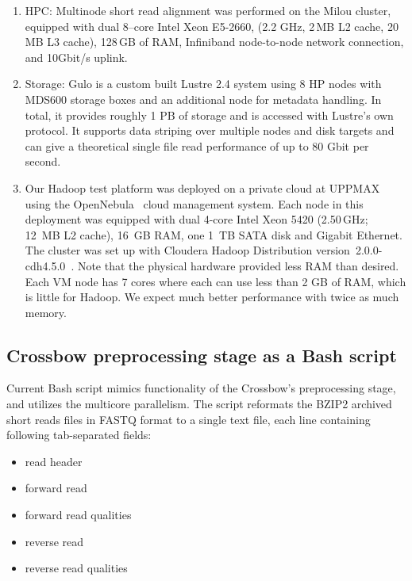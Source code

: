 \documentclass[10pt]{article}
\begin{document}
\begin{enumerate}

\item 
HPC:
Multinode short read alignment was performed on the Milou cluster\cite{milouCluster}, equipped with dual 8--core Intel Xeon E5-2660, (2.2 GHz, 2\,MB L2 cache, 20\,MB L3 cache), 128\,GB of RAM, Infiniband node-to-node network connection, and 10Gbit/s uplink.

\item Storage: 
Gulo\cite{gulo} is a custom built Lustre 2.4 system using 8 HP nodes with MDS600 storage boxes and an additional node for metadata handling. In total, it provides roughly 1 PB of storage and is accessed with Lustre's own protocol. It supports data striping over multiple nodes and disk targets and can give a theoretical single file read performance of up to 80 Gbit per second.

\item Our Hadoop test platform was deployed on a private cloud at UPPMAX using the OpenNebula~\cite{opennebula} cloud management system. Each node in this deployment was equipped with dual 4-core Intel Xeon 5420 (2.50\,GHz; 12~MB L2 cache), 16~GB RAM, one 1~TB SATA disk and Gigabit Ethernet. The cluster was set up with Cloudera Hadoop Distribution version~2.0.0-cdh4.5.0~\cite{cloudera}.
Note that the physical hardware provided less RAM than desired. Each VM node has 7 cores where each can use less than 2 GB of RAM, which is little for Hadoop. We expect much better performance with twice as much memory.
\end{enumerate}


\subsection*{Crossbow preprocessing stage as a Bash script}
Current Bash script mimics functionality of the Crossbow's preprocessing stage, and utilizes the multicore parallelism. The script reformats the BZIP2 archived short reads files in FASTQ format to a single text file, each line containing following tab-separated fields:
\begin{itemize}
\item read header
\item forward read
\item forward read qualities
\item reverse read
\item reverse read qualities
\end{itemize}
\end{document}
